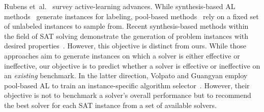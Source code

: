 \documentclass[sn-basic, Numbered]{sn-jnl} %
\begin{document}
Rubens et~al.~\cite{RubensESK15} survey active-learning advances.
While synthesis-based AL methods~\cite{0001AEMN22,GarzonMG22,2019gaal} generate instances for labeling, pool-based methods~\cite{GolbandiKL11,HarpaleY08,KorenBV09} rely on a fixed set of unlabeled instances to sample from.
Recent synthesis-based methods within the field of SAT solving demonstrate the generation of problem instances with desired properties~\cite{0001AEMN22,GarzonMG22}.
However, this objective is distinct from ours.
While those approaches aim to generate instances on which a solver is either effective or ineffective, our objective is to predict whether a solver is effective or ineffective on an \emph{existing} benchmark.
In the latter direction, Volpato and Guangyan employ pool-based AL to train an instance-specific algorithm selector~\cite{volpato2019active}.
However, their objective is not to benchmark a solver's overall performance but to recommend the best solver for each SAT instance from a set of available solvers.
\end{document}
